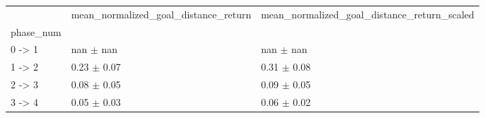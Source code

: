 \begin{tabular}{lll}
\toprule
 & mean_normalized_goal_distance_return & mean_normalized_goal_distance_return_scaled \\
phase_num &  &  \\
\midrule
0 -> 1 & nan $\pm$ nan & nan $\pm$ nan \\
1 -> 2 & 0.23 $\pm$ 0.07 & 0.31 $\pm$ 0.08 \\
2 -> 3 & 0.08 $\pm$ 0.05 & 0.09 $\pm$ 0.05 \\
3 -> 4 & 0.05 $\pm$ 0.03 & 0.06 $\pm$ 0.02 \\
\bottomrule
\end{tabular}
